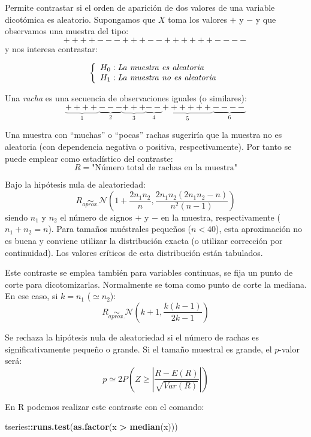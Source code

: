 \documentclass[
  spanish,
  10pt,
]{book}
\newenvironment{Shaded}{\begin{snugshade}}{\end{snugshade}}
\newcommand{\FunctionTok}[1]{\textcolor[rgb]{0.13,0.29,0.53}{\textbf{#1}}}
\newcommand{\NormalTok}[1]{#1}
\newcommand{\SpecialCharTok}[1]{\textcolor[rgb]{0.81,0.36,0.00}{\textbf{#1}}}
\theoremstyle{break}
\theoremstyle{nonumberplain}
\begin{document}
Permite contrastar si el orden de aparición de dos valores de una variable dicotómica es aleatorio.
Supongamos que \(X\) toma los valores \(+\) y \(-\) y que observamos una muestra del tipo:
\[++++---+++--++++++----\]
y nos interesa contrastar:

\[\left\{ \begin{array}[c]{l}
    H_0:\mathit{La\ muestra\ es\ aleatoria}\\
    H_1:\mathit{La\ muestra\ no\ es\ aleatoria}
\end{array}\right.\]

Una \emph{racha} es una secuencia de observaciones iguales (o similares):
\[\underbrace{++++}_{1}\underbrace{---}_{2}\underbrace{+++}_{3}
\underbrace{--}_{4}\underbrace{++++++}_{5}\underbrace{----}_{6}\]

Una muestra con ``muchas'' o ``pocas'' rachas sugeriría que la muestra no es aleatoria (con dependencia negativa o positiva, respectivamente).
Por tanto se puede emplear como estadístico del contraste:
\[R=\text{"Número total de rachas en la muestra"}\]

Bajo la hipótesis nula de aleatoriedad:
\[R\underset{aprox.}{\sim} \mathcal{N}\left(  1+\frac{2n_{1}n_{2}}{n},
\frac{2n_{1}n_{2}(2n_{1}n_{2}-n)}{n^{2}(n-1)}\right)\]
siendo \(n_{1}\) y \(n_{2}\) el número de signos \(+\) y \(-\) en la muestra, respectivamente (\(n_{1}+n_{2}=n\)).
Para tamaños muéstrales pequeños (\(n<40\)), esta aproximación no es buena y conviene utilizar la distribución exacta (o utilizar corrección por continuidad).
Los valores críticos de esta distribución están tabulados.

Este contraste se emplea también para variables continuas, se fija un punto de corte para dicotomizarlas.
Normalmente se toma como punto de corte la mediana.
En ese caso, si \(k=n_{1}\) (\(\simeq n_{2}\)):
\[R\underset{aprox.}{\sim} \mathcal{N}\left(  k+1,\frac{k(k-1)}{2k-1}\right)\]

Se rechaza la hipótesis nula de aleatoriedad si el número de rachas es significativamente pequeño o grande.
Si el tamaño muestral es grande, el \(p\)-valor será:
\[p \simeq 2 P\left( Z \geq \left\vert 
\frac{R-E(R)}{\sqrt{Var(R)}} \right\vert \right)\]

En R podemos realizar este contraste con el comando:

\begin{Shaded}
\begin{Highlighting}[]
\NormalTok{tseries}\SpecialCharTok{::}\FunctionTok{runs.test}\NormalTok{(}\FunctionTok{as.factor}\NormalTok{(x }\SpecialCharTok{\textgreater{}} \FunctionTok{median}\NormalTok{(x)))}
\end{Highlighting}
\end{Shaded}
\end{document}
